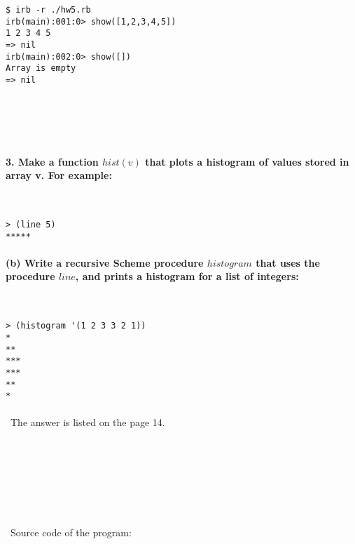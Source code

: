 \documentclass{article}
\begin{document}
\begin{verbatim} 
$ irb -r ./hw5.rb
irb(main):001:0> show([1,2,3,4,5])
1 2 3 4 5
=> nil
irb(main):002:0> show([])
Array is empty
=> nil
\end{verbatim}
	
\paragraph{}\
\paragraph{}\

\paragraph{3. Make a function \(hist(v)\) that plots a histogram of values stored in array v. For example:}\

\begin{verbatim} 
> (line 5)
*****
\end{verbatim}

\paragraph{\qquad (b) Write a recursive Scheme procedure \(histogram\) that uses the procedure \(line\), and prints a histogram for a list of integers:}\

\begin{verbatim} 
> (histogram '(1 2 3 3 2 1))
*
**
***
***
**
*
\end{verbatim}
\paragraph{}\
		The answer is listed on the page 14.

\paragraph{}\
\paragraph{}\
\paragraph{}\
\paragraph{}\
Source code of the program:
\end{document}
